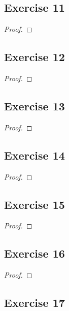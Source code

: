 \documentclass[14pt]{extarticle}
\begin{document}
\subsection{Exercise 11}

\begin{proof}

\end{proof}

\subsection{Exercise 12}

\begin{proof}

\end{proof}

\subsection{Exercise 13}

\begin{proof}

\end{proof}

\subsection{Exercise 14}

\begin{proof}

\end{proof}

\subsection{Exercise 15}

\begin{proof}

\end{proof}

\subsection{Exercise 16}

\begin{proof}

\end{proof}

\subsection{Exercise 17}
\end{document}

